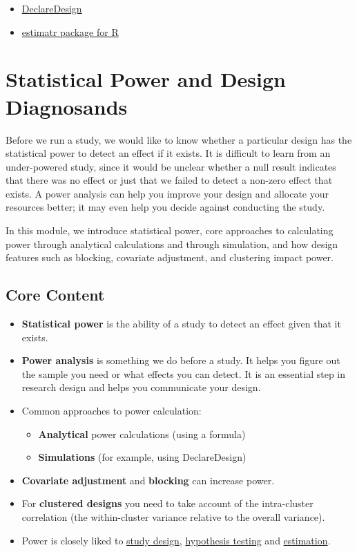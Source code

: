 \documentclass[12pt,]{book}
\begin{document}
\begin{itemize}
\item
  \href{https://declaredesign.org}{DeclareDesign}
\item
  \href{https://declaredesign.org/r/estimatr/}{estimatr package for R}
\end{itemize}

\hypertarget{statistical-power-and-design-diagnosands}{%
\chapter{Statistical Power and Design Diagnosands}\label{statistical-power-and-design-diagnosands}}

Before we run a study, we would like to know whether a particular design has the statistical power to detect an effect if it exists. It is difficult to learn from an under-powered study, since it would be unclear whether a null result indicates that there was no effect or just that we failed to detect a non-zero effect that exists. A power analysis can help you improve your design and allocate your resources better; it may even help you decide against conducting the study.

In this module, we introduce statistical power, core approaches to calculating power through analytical calculations and through simulation, and how design features such as blocking, covariate adjustment, and clustering impact power.

\hypertarget{core-content-5}{%
\section{Core Content}\label{core-content-5}}

\begin{itemize}
\item
  \textbf{Statistical power} is the ability of a study to detect an effect given that it exists.
\item
  \textbf{Power analysis} is something we do before a study. It helps you figure out the sample you need or what effects you can detect. It is an essential step in research design and helps you communicate your design.
\item
  Common approaches to power calculation:

  \begin{itemize}
  \item
    \textbf{Analytical} power calculations (using a formula)
  \item
    \textbf{Simulations} (for example, using DeclareDesign)
  \end{itemize}
\item
  \textbf{Covariate adjustment} and \textbf{blocking} can increase power.
\item
  For \textbf{clustered designs} you need to take account of the intra-cluster correlation (the within-cluster variance relative to the overall variance).
\item
  Power is closely liked to \href{the-research-design-process.html}{study design}, \href{hypothesis-testing.html}{hypothesis testing} and \href{estimands-and-estimators.html}{estimation}.
\end{itemize}
\end{document}
